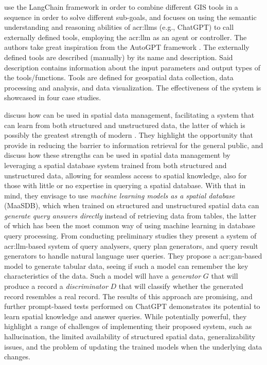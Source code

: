 \cite{zhangGeoGPTUnderstandingProcessing2023} use the LangChain framework \citep{chaseLangChain2022} in order to combine different GIS tools in a sequence in order to solve different sub-goals, and focuses on using the semantic understanding and reasoning abilities of \glspl{acr:llm} (e.g., ChatGPT) to call externally defined tools, employing the \gls{acr:llm} as an agent or controller. The authors take great inspiration from the AutoGPT framework \citep{richardAutoGPTHeartOpensource2023}. The externally defined tools are described (manually) by its name and description. Said description contains information about the input parameters and output types of the tools/functions. Tools are defined for geospatial data collection, data processing and analysis, and data visualization. The effectiveness of the system is showcased in four case studies.

\cite{qiMaaSDBSpatialDatabases2023} discuss how  can be used in spatial data management, facilitating a system that can learn from both structured and unstructured data, the latter of which is possibly the greatest strength of modern . They highlight the opportunity that  provide in reducing the barrier to information retrieval for the general public, and discuss how these strengths can be used in spatial data management by leveraging a spatial database system trained from both structured and unstructured data, allowing for seamless access to spatial knowledge, also for those with little or no expertise in querying a spatial database. With that in mind, they envisage to use \textit{machine learning models as a spatial database} (MaaSDB), which when trained on structured and unstructured spatial data can \textit{generate query answers directly} instead of retrieving data from tables, the latter of which has been the most common way of using machine learning in database query processing. From conducting preliminary studies they present a system of \acrshort{acr:llm}-based system of query analysers, query plan generators, and query result generators to handle natural language user queries. They propose a \gls{acr:gan}-based model to generate tabular data, seeing if such a model can remember the key characteristics of the data. Such a model will have a \textit{generator} $G$ that will produce a record a \textit{discriminator} $D$ that will classify whether the generated record resembles a real record. The results of this approach are promising, and further prompt-based tests performed on ChatGPT demonstrates its potential to learn spatial knowledge and answer queries. While potentially powerful, they highlight a range of challenges of implementing their proposed system, such as hallucination, the limited availability of structured spatial data, generalizability issues, and the problem of updating the trained models when the underlying data changes.



